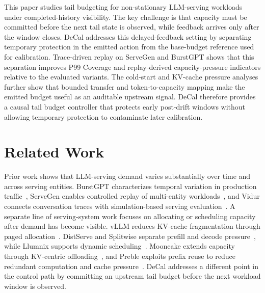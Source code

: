 \documentclass[sigplan,10pt, anonymous]{acmart}
\begin{document}
This paper studies tail budgeting for non-stationary LLM-serving workloads under completed-history visibility. The key challenge is that capacity must be committed before the next tail state is observed, while feedback arrives only after the window closes. DeCal addresses this delayed-feedback setting by separating temporary protection in the emitted action from the base-budget reference used for calibration. Trace-driven replay on ServeGen and BurstGPT shows that this separation improves P99 Coverage and replay-derived capacity-pressure indicators relative to the evaluated variants. The cold-start and KV-cache pressure analyses further show that bounded transfer and token-to-capacity mapping make the emitted budget useful as an auditable upstream signal. DeCal therefore provides a causal tail budget controller that protects early post-drift windows without allowing temporary protection to contaminate later calibration.




\balance




\appendix

\section{Related Work}
\label{app:related-work}
Prior work shows that LLM-serving demand varies substantially over time and across serving entities. BurstGPT characterizes temporal variation in production traffic~\cite{Wang2025KDD}, ServeGen enables controlled replay of multi-entity workloads~\cite{Xiang2026NSDI}, and Vidur connects conversation traces with simulation-based serving evaluation~\cite{Agrawal2024MLSYS}. A separate line of serving-system work focuses on allocating or scheduling capacity after demand has become visible. vLLM reduces KV-cache fragmentation through paged allocation~\cite{Woosuk2023SOSP}. DistServe and Splitwise separate prefill and decode pressure~\cite{Zhong2024OSDI, Pratyush2024ISCA}, while Llumnix supports dynamic scheduling~\cite{Sun2024OSDI}. Mooncake extends capacity through KV-centric offloading~\cite{Qin2025}, and Preble exploits prefix reuse to reduce redundant computation and cache pressure~\cite{Srivatsa2025ICLR}. DeCal addresses a different point in the control path by committing an upstream tail budget before the next workload window is observed.
\end{document}
